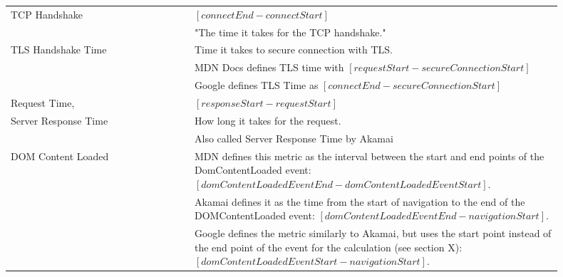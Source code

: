 \begin{center}
\begin{longtable}{ | p{0.3\linewidth} | p{0.6\linewidth} | }
	\hline
	TCP Handshake %
	& $[connectEnd - connectStart]$ \\
	& "The time it takes for the TCP handshake." \\ %

	\hline
	TLS Handshake Time
	& Time it takes to secure connection with TLS.  \\
	& MDN Docs defines TLS time with $[requestStart - secureConnectionStart]$ \\
	& Google defines TLS Time as $[connectEnd - secureConnectionStart]$ \\ %

	\hline
	Request Time, 
	& $[responseStart - requestStart]$ \\ 
	Server Response Time & How long it takes for the request. \\ %
	& Also called Server Response Time by Akamai \\ %
	
	\hline
	DOM Content Loaded
	& MDN defines this metric as the interval between the start and end points of the DomContentLoaded event: $[domContentLoadedEventEnd - domContentLoadedEventStart]$. \\
	& Akamai defines it as the time from the start of navigation to the end of the DOMContentLoaded event: $[domContentLoadedEventEnd - navigationStart]$. \\
	& Google defines the metric similarly to Akamai, but uses the start point instead of the end point of the event for the calculation (see section X):
$[domContentLoadedEventStart - navigationStart]$. \\


\end{longtable}
\end{center}
